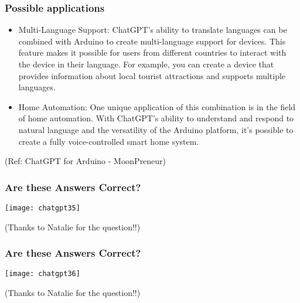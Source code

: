 \begin{frame}[fragile]\frametitle{Possible applications}



\begin{itemize}
\item Multi-Language Support: ChatGPT’s ability to translate languages can be combined with Arduino to create multi-language support for devices. This feature makes it possible for users from different countries to interact with the device in their language. For example, you can create a device that provides information about local tourist attractions and supports multiple languages.
\item Home Automation: One unique application of this combination is in the field of home automation. With ChatGPT’s ability to understand and respond to natural language and the versatility of the Arduino platform, it’s possible to create a fully voice-controlled smart home system. 
\end{itemize}	 



\tiny{(Ref: ChatGPT for Arduino - MoonPreneur)}
\end{frame}

\begin{frame}[fragile]\frametitle{Are these Answers Correct?}


\begin{center}
\texttt{[image: chatgpt35]}

\tiny{(Thanks to Natalie for the question!!)}

\end{center}


\end{frame}

\begin{frame}[fragile]\frametitle{Are these Answers Correct?}


\begin{center}
\texttt{[image: chatgpt36]}

\tiny{(Thanks to Natalie for the question!!)}

\end{center}


\end{frame}




